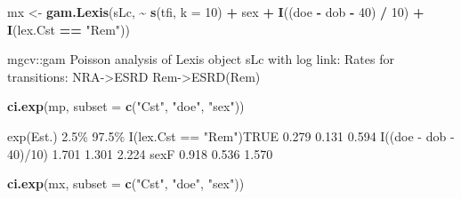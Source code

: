 \documentclass[
]{book}
\newenvironment{Shaded}{\begin{snugshade}}{\end{snugshade}}
\newcommand{\AttributeTok}[1]{\textcolor[rgb]{0.13,0.29,0.53}{#1}}
\newcommand{\DecValTok}[1]{\textcolor[rgb]{0.00,0.00,0.81}{#1}}
\newcommand{\FunctionTok}[1]{\textcolor[rgb]{0.13,0.29,0.53}{\textbf{#1}}}
\newcommand{\NormalTok}[1]{#1}
\newcommand{\OtherTok}[1]{\textcolor[rgb]{0.56,0.35,0.01}{#1}}
\newcommand{\SpecialCharTok}[1]{\textcolor[rgb]{0.81,0.36,0.00}{\textbf{#1}}}
\newcommand{\StringTok}[1]{\textcolor[rgb]{0.31,0.60,0.02}{#1}}
\begin{document}
\begin{enumerate}
\begin{Shaded}
\begin{Highlighting}[]
\NormalTok{mx }\OtherTok{\textless{}{-}} \FunctionTok{gam.Lexis}\NormalTok{(sLc,}
                \SpecialCharTok{\textasciitilde{}} \FunctionTok{s}\NormalTok{(tfi, }\AttributeTok{k =} \DecValTok{10}\NormalTok{) }\SpecialCharTok{+} 
\NormalTok{                  sex }\SpecialCharTok{+} \FunctionTok{I}\NormalTok{((doe }\SpecialCharTok{{-}}\NormalTok{ dob }\SpecialCharTok{{-}} \DecValTok{40}\NormalTok{) }\SpecialCharTok{/} \DecValTok{10}\NormalTok{) }\SpecialCharTok{+} 
                  \FunctionTok{I}\NormalTok{(lex.Cst }\SpecialCharTok{==} \StringTok{"Rem"}\NormalTok{))}
\end{Highlighting}
\end{Shaded}

\begin{Shaded}
\begin{Highlighting}[]
\NormalTok{mgcv::gam Poisson analysis of Lexis object sLc with log link:}
\NormalTok{Rates for transitions:}
\NormalTok{NRA{-}\textgreater{}ESRD}
\NormalTok{Rem{-}\textgreater{}ESRD(Rem)}
\end{Highlighting}
\end{Shaded}

\begin{Shaded}
\begin{Highlighting}[]
\FunctionTok{ci.exp}\NormalTok{(mp, }\AttributeTok{subset =} \FunctionTok{c}\NormalTok{(}\StringTok{"Cst"}\NormalTok{, }\StringTok{"doe"}\NormalTok{, }\StringTok{"sex"}\NormalTok{))}
\end{Highlighting}
\end{Shaded}

\begin{Shaded}
\begin{Highlighting}[]
\NormalTok{                        exp(Est.)  2.5\% 97.5\%}
\NormalTok{I(lex.Cst == "Rem")TRUE     0.279 0.131 0.594}
\NormalTok{I((doe {-} dob {-} 40)/10)      1.701 1.301 2.224}
\NormalTok{sexF                        0.918 0.536 1.570}
\end{Highlighting}
\end{Shaded}

\begin{Shaded}
\begin{Highlighting}[]
\FunctionTok{ci.exp}\NormalTok{(mx, }\AttributeTok{subset =} \FunctionTok{c}\NormalTok{(}\StringTok{"Cst"}\NormalTok{, }\StringTok{"doe"}\NormalTok{, }\StringTok{"sex"}\NormalTok{))}
\end{Highlighting}
\end{Shaded}


\end{enumerate}
\end{document}
